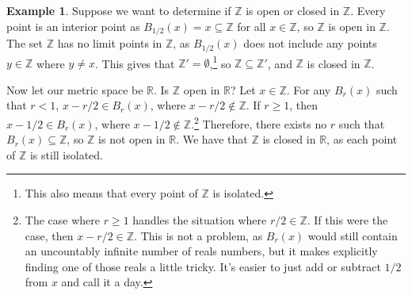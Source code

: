 \documentclass{article}
\newcommand{\R}{\mathbb{R}}
\newcommand{\Z}{\mathbb{Z}}
\theoremstyle{definition}
\newtheorem{example}{Example}[section]
\begin{document}
	\begin{example}
		Suppose we want to determine if $ \Z $ is open or closed in $ \Z $. Every point is an interior point as $ B_{1/2}(x)={x}\subseteq\Z $ for all $ x\in\Z $, so $ \Z $ is open in $ \Z $. The set $ \Z $ has no limit points in $ \Z $, as $ B_{1/2}(x) $ does not include any points $ y\in\Z $ where $ y\neq x $. This gives that $ \Z'=\emptyset $,\footnote{This also means that every point of $ \Z $ is isolated.} so $ \Z\subseteq \Z' $, and $ \Z $ is closed in $ \Z $.
		
		Now let our metric space be $ \R $. Is $ \Z $ open in $ \R $? Let $ x\in\Z $. For any $ B_r(x) $ such that $ r<1 $, $ x-r/2\in B_r(x) $, where $ x-r/2\notin\Z $. If $ r\ge 1 $, then $ x-1/2\in B_r(x) $, where $ x-1/2\notin\Z $.\footnote{The case where $ r\ge 1 $ handles the situation where $ r/2\in\Z $. If this were the case, then $ x-r/2\in\Z $. This is not a problem, as $ B_r(x) $ would still contain an uncountably infinite number of reals numbers, but it makes explicitly finding one of those reals a little tricky. It's easier to just add or subtract $ 1/2 $ from $ x $ and call it a day.} Therefore, there exists no $ r $ such that $ B_r(x)\subseteq \Z $, so $ \Z $ is not open in $ \R $. We have that $ \Z $ is closed in $ \R $, as each point of $ \Z $ is still isolated.  
	\end{example}
	
\end{document}
